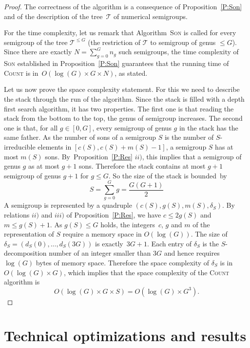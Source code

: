 \documentclass[reqno,11pt]{amsart}
\theoremstyle{plain}
\theoremstyle{definition}
\renewcommand{\leq}{\leqslant}
\begin{document}
\begin{proof}
The correctness of the algorithm is a consequence of Proposition~\ref{P:Son} and of the description of the tree~$\mathcal{T}$ of numerical semigroups.

For the time complexity, let us remark that Algorithm~\textsc{Son} is called for every semigroup of the tree $\mathcal{T}^{\leq G}$ (the restriction of $\mathcal{T}$ to semigroup of genus $\leq G$). 
Since there are exactly $N=\sum_{g=0}^G n_g$ such semigroups, the time complexity of \textsc{Son} established in Proposition~\ref{P:Son} guarantees that the running time of \textsc{Count} is in~$O(\log(G)\times G\times N)$, as stated.

Let us now prove the space complexity statement.
For  this we need to describe the stack through  the run of the algorithm.
Since the stack is filled  with a depth first search algorithm, it has two properties.
The first one is that reading the stack from the bottom to the top, the genus of  semigroup increases.  
The second one is that, for all $g\in[0,G]$, every semigroup of genus $g$ in the stack has the same father.
As the number of sons of a  semigroup $S$ is the number of $S$-irreducible elements in $[c(S),c(S)+m(S)-1]$,  a semigroup $S$ has at most $m(S)$ sons. 
By~Proposition~\ref{P:Res} $ii)$, this implies that a semigroup of genus $g$ as at most $g+1$ sons.
Therefore the stack contains at most $g+1$ semigroup of genus $g+1$ for $g\leq G$. 
So the size of the stack is bounded~by 
\[
S=\sum_{g=0}^Gg=\frac{G(G+1)}2
\]
A semigroup is represented by a quadruple $(c(S),g(S),m(S),\delta_S)$. 
By relations $ii)$ and $iii)$ of Proposition~\ref{P:Res}, we have $c\leq 2g(S)$ and $m\leq g(S)+1$. 
As $g(S)\leq G$ holds, the integers~$c$, $g$  and $m$ of the representation of $S$ require a memory space in $O(\log(G))$. 
The size of~$\delta_S=(d_S(0),...,d_S(3G))$ is exactly~$3G+1$. 
Each entry of $\delta_S$ is the $S$-decomposition number of an integer smaller than $3G$ and hence
requires $\log(G)$ bytes of memory space.
Therefore the space complexity of $\delta_S$ is in~$O(\log(G)\times G)$, which implies that the space complexity of the \textsc{Count} algorithm is
\[
O(\log(G)\times G\times S)= O(\log(G)\times G^3).
\]
\end{proof}

\section{Technical optimizations and results}
\end{document}
